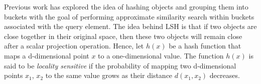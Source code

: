\documentclass{article}
\begin{document}
Previous work \cite{hashing_algoritghms_survey} has explored the idea of hashing objects and grouping them into buckets with the goal of performing approximate similarity search within buckets associated with the query element.  The idea behind LSH is that if two objects are close together in their original space, then these two objects will remain close after a scalar projection operation. Hence, let $h(x)$ be a hash function that maps a d-dimensional point $x$ to a one-dimensional value. The function $h(x)$ is said to be \textit{locality sensitive} if the probability of mapping two d-dimensional points $x_1$, $x_2$ to the same value grows as their distance $d(x_1, x_2)$ decreases.  



 
\end{document}
